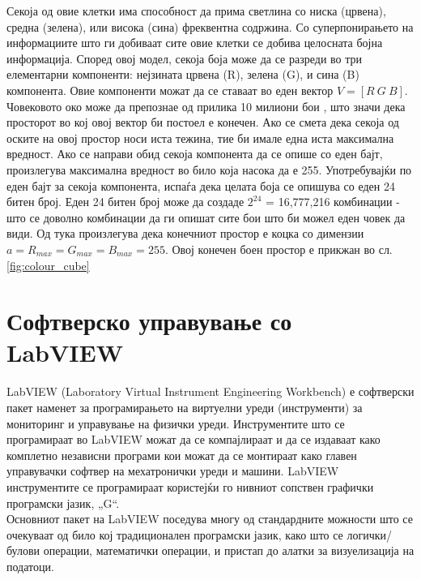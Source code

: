 \documentclass[11pt]{article}
\begin{document}
    Секоја од овие клетки има способност да прима светлина со ниска (црвена), средна (зелена), или висока (сина) фреквентна содржина. Со суперпонирањето на информациите што ги добиваат сите овие клетки се добива целосната бојна информација. Според овој модел, секоја боја може да се разреди во три елементарни компоненти: нејзината црвена (R), зелена (G), и сина (B) компонента. Овие компоненти можат да се ставаат во еден вектор $ V = [R\ G\ B]$. Човековото око може да препознае од прилика 10 милиони бои \cite{nColours}, што значи дека просторот во кој овој вектор би постоел е конечен. Ако се смета дека секоја од оските на овој простор носи иста тежина, тие би имале една иста максимална вредност. Ако се направи обид секоја компонента да се опише со еден бајт, произлегува максимална вредност во било која насока да е 255. Употребувајќи по еден бајт за секоја компонента, испаѓа дека целата боја се опишува со еден 24 битен број. Еден 24 битен број може да создаде $2^{24}$ = 16,777,216 комбинации - што се доволно комбинации да ги опишат сите бои што би можел еден човек да види. Од тука произлегува дека конечниот простор е коцка со димензии $a = R_{max} = G_{max} = B_{max} = 255 $.
    Овој конечен боен простор е прикжан во сл. \ref{fig:colour_cube}
    \bigbreak

\newpage

\section{Софтверско управување со LabVIEW}
  LabVIEW (Laboratory Virtual Instrument Engineering Workbench) е софтверски пакет наменет за програмирањето на виртуелни уреди (инструменти) за мониторинг и управување на физички уреди. Инструментите што се програмираат во LabVIEW можат да се компајлираат и да се издаваат како комплетно независни програми кои можат да се монтираат како главен управувачки софтвер на мехатронички уреди и машини. LabVIEW инструментите се програмираат користејќи го нивниот сопствен графички програмски јазик, „G“.
  \\
  Основниот пакет на LabVIEW поседува многу од стандардните можности што се очекуваат од било кој традиционален програмски јазик, како што се логички/булови операции, математички операции, и пристап до алатки за визуелизација на податоци.
\end{document}
